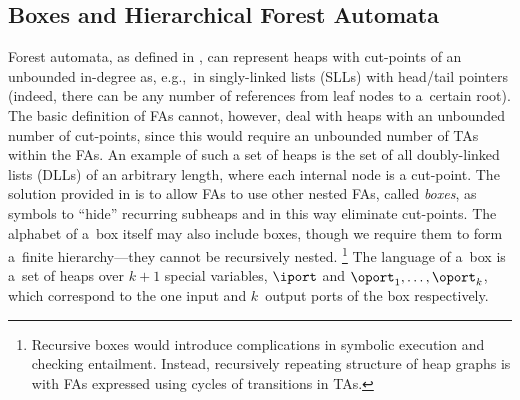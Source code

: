 \subsection{Boxes and Hierarchical Forest Automata}\label{sec:boxes}
Forest automata, as defined in , can represent heaps with
cut-points of an unbounded in-degree as,
e.g.,~in singly-linked lists (SLLs) with head/tail pointers (indeed, there can be any number of
references from leaf nodes to a~certain root).
The basic definition of FAs cannot, however, deal with
heaps with an unbounded number of cut-points, since this would require
an unbounded number of TAs within the FAs.
An example of such a set of heaps is the
set of all doubly-linked lists (DLLs) of an arbitrary length, where each internal node is a cut-point.
The solution provided in \cite{habermehl:forest} is to allow FAs to use
other nested FAs, called \emph{boxes}, as symbols to ``hide'' recurring
subheaps 
and in this way eliminate
cut-points. 
%
The alphabet of a~box itself may also include boxes, though we require them
to form a~finite hierarchy---they cannot be recursively nested.%
\footnote{Recursive boxes would introduce complications in symbolic execution
and checking entailment. Instead, recursively repeating structure of heap graphs is
with FAs expressed using cycles of transitions in TAs.}%
%
The language of a~box is a~set of heaps over $k+1$ special variables, $\iport$
and $\oport_1, \ldots, \oport_k$, which correspond to the one input and
$k$~output ports of the box respectively.

